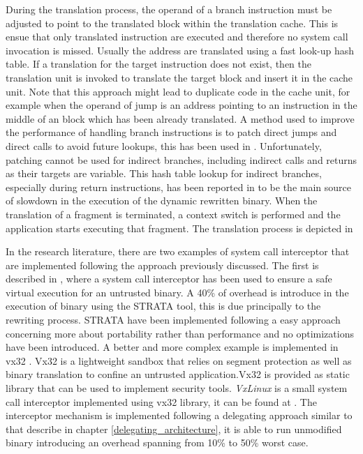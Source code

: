 During the translation process, the operand of a branch instruction must be adjusted to point to the translated block within the translation cache. This is ensue that only translated instruction are executed and therefore no system call invocation is missed. Usually the address are translated using a fast look-up hash table. 
If a translation for the target instruction does not exist, then the translation unit is invoked to translate the target block and insert it in the cache unit. Note that this approach might lead to duplicate code in the cache unit, for example when the operand of jump is an address pointing to an instruction in the middle of an block which has been already translated. A method used to improve the performance of handling branch instructions is to patch direct jumps and direct calls to avoid future lookups, this has been used in \cite{vx32, DynamoRio}. Unfortunately, patching cannot be used for indirect branches, including indirect calls and returns as their targets are variable. This hash table lookup for indirect branches, especially during return instructions, has been reported in \cite{vx32} to be the main source of slowdown in the execution of the dynamic rewritten binary. When the translation of a fragment is terminated, a context switch is performed and the application starts executing that fragment. The translation process is depicted in 


In the research literature, there are two examples of system call interceptor that are implemented following the approach previously discussed. The first is described in \cite{sata}, where a system call interceptor has been used to ensure a safe virtual execution for an untrusted binary.  A 40\% of overhead is introduce in the execution of binary using the STRATA tool, this is due principally to the rewriting process.  STRATA have been implemented following a easy approach concerning more about portability rather than performance and no optimizations have been introduced. A better and more complex example is implemented in vx32 \cite{vx32}. Vx32 is a lightweight sandbox that relies on segment protection as well as binary translation to confine an untrusted application.Vx32 is provided as static library that can be used to implement security tools. \emph{VxLinux} is a small system call interceptor implemented using vx32 library, it can be found at \cite{soft:vx32}. The interceptor mechanism is implemented following a delegating approach similar to that describe in chapter \ref{delegating_architecture}, it is able to run unmodified binary introducing an overhead spanning from 10\% to 50\% worst case. 




